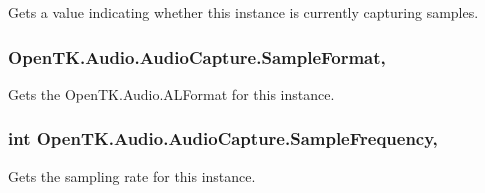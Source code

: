Gets a value indicating whether this instance is currently capturing samples. 

\hypertarget{class_open_t_k_1_1_audio_1_1_audio_capture_a5931e82f4c05af8ae4f4b3ad20893c40}{
\subsubsection[{Sample\-Format}]{ Open\-T\-K.\-Audio.\-Audio\-Capture.\-Sample\-Format\hspace{0.3cm}{\ttfamily [get]}, {\ttfamily [set]}}}\label{class_open_t_k_1_1_audio_1_1_audio_capture_a5931e82f4c05af8ae4f4b3ad20893c40}


Gets the Open\-T\-K.\-Audio.\-A\-L\-Format for this instance. 

\hypertarget{class_open_t_k_1_1_audio_1_1_audio_capture_a226fcc963c5e78fdf94046086f546990}{
\subsubsection[{Sample\-Frequency}]{\setlength{\rightskip}{0pt plus 5cm}int Open\-T\-K.\-Audio.\-Audio\-Capture.\-Sample\-Frequency\hspace{0.3cm}{\ttfamily [get]}, {\ttfamily [set]}}}\label{class_open_t_k_1_1_audio_1_1_audio_capture_a226fcc963c5e78fdf94046086f546990}


Gets the sampling rate for this instance. 

